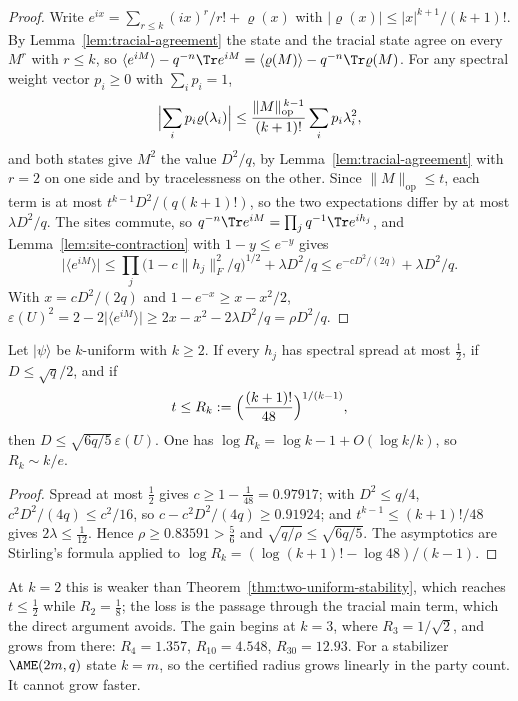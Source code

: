 \begin{proof}
Write \(e^{ix}=\sum_{r\leq k}(ix)^r/r!+\varrho(x)\) with
\(\lvert\varrho(x)\rvert\leq\lvert x\rvert^{k+1}/(k+1)!\).  By
Lemma~\ref{lem:tracial-agreement} the state and the tracial state agree on
every \(M^r\) with \(r\leq k\), so
\(\langle e^{iM}\rangle-q^{-n}\Tr e^{iM}
=\langle\varrho(M)\rangle-q^{-n}\Tr\varrho(M)\).  For any spectral weight
vector \(p_i\geq0\) with \(\sum_ip_i=1\),
\[
 \Bigl\lvert\sum_ip_i\varrho(\lambda_i)\Bigr\rvert
 \leq\frac{\lVert M\rVert_{\mathrm{op}}^{\,k-1}}{(k+1)!}\sum_ip_i\lambda_i^2 ,
\]
and both states give \(M^2\) the value \(D^2/q\), by
Lemma~\ref{lem:tracial-agreement} with \(r=2\) on one side and by
tracelessness on the other.  Since
\(\lVert M\rVert_{\mathrm{op}}\leq t\), each term is at most
\(t^{k-1}D^2/(q(k+1)!)\), so the two expectations differ by at most
\(\lambda D^2/q\).  The sites commute, so
\(q^{-n}\Tr e^{iM}=\prod_jq^{-1}\Tr e^{ih_j}\), and
Lemma~\ref{lem:site-contraction} with \(1-y\leq e^{-y}\) gives
\[
 \bigl\lvert\langle e^{iM}\rangle\bigr\rvert
  \leq\prod_j\bigl(1-c\lVert h_j\rVert_F^2/q\bigr)^{1/2}
      +\lambda D^2/q
  \leq e^{-cD^2/(2q)}+\lambda D^2/q .
\]
With \(x=cD^2/(2q)\) and \(1-e^{-x}\geq x-x^2/2\),
\(\varepsilon(U)^2=2-2\lvert\langle e^{iM}\rangle\rvert
\geq2x-x^2-2\lambda D^2/q=\rho D^2/q\).
\end{proof}

\begin{corollary}
\label{cor:k-uniform-region}
Let \(\lvert\psi\rangle\) be \(k\)-uniform with \(k\geq2\).  If every
\(h_j\) has spectral spread at most \(\frac12\), if \(D\leq\sqrt q/2\), and
if
\[
 t\leq R_k:=\Bigl(\frac{(k+1)!}{48}\Bigr)^{1/(k-1)},
\]
then \(D\leq\sqrt{6q/5}\,\varepsilon(U)\).  One has
\(\log R_k=\log k-1+O(\log k/k)\), so \(R_k\sim k/e\).
\end{corollary}

\begin{proof}
Spread at most \(\frac12\) gives \(c\geq1-\frac1{48}=0.97917\); with
\(D^2\leq q/4\), \(c^2D^2/(4q)\leq c^2/16\), so
\(c-c^2D^2/(4q)\geq0.91924\); and \(t^{k-1}\leq(k+1)!/48\) gives
\(2\lambda\leq\frac1{12}\).  Hence \(\rho\geq0.83591>\frac56\) and
\(\sqrt{q/\rho}\leq\sqrt{6q/5}\).  The asymptotics are Stirling's formula
applied to \(\log R_k=(\log(k+1)!-\log48)/(k-1)\).
\end{proof}

At \(k=2\) this is weaker than Theorem~\ref{thm:two-uniform-stability},
which reaches \(t\leq\frac12\) while \(R_2=\frac18\); the loss is the
passage through the tracial main term, which the direct argument avoids.
The gain begins at \(k=3\), where \(R_3=1/\sqrt2\), and grows from there:
\(R_4=1.357\), \(R_{10}=4.548\), \(R_{30}=12.93\).  For a stabilizer
\(\AME(2m,q)\) state \(k=m\), so the certified radius grows linearly in the
party count.  It cannot grow faster.

